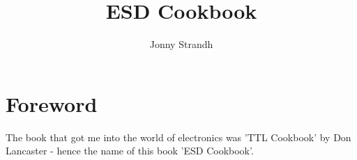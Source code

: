 \documentclass[titlepage] {book}
\author{Jonny Strandh}
\title{ESD Cookbook}
\begin{document}
	\maketitle
	\newpage
	\tableofcontents
	\newpage
	\chapter{Foreword}
    The book that got me into the world of electronics was 'TTL Cookbook' by Don Lancaster - hence the name of this book 'ESD Cookbook'.
    
   
    
	\printindex
	
\end{document}
